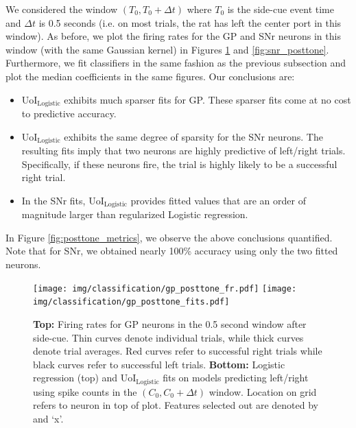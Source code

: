 \documentclass[11pt]{article}
\begin{document}
We considered the window $(T_0, T_0 + \Delta t)$ where $T_0$ is the side-cue event time and $\Delta t$ is 0.5 seconds (i.e. on most trials, the rat has left the center port in this window). As before, we plot the firing rates for the GP and SNr neurons in this window (with the same Gaussian kernel) in Figures \ref{fig:gp_posttone} and \ref{fig:snr_posttone}. Furthermore, we fit classifiers in the same fashion as the previous subsection and plot the median coefficients in the same figures. Our conclusions are:
\begin{itemize}
	\item  UoI$_{\text{Logistic}}$ exhibits much sparser fits for GP. These sparser fits come at no cost to predictive accuracy.
	\item UoI$_{\text{Logistic}}$ exhibits the same degree of sparsity for the SNr neurons. The resulting fits imply that two neurons are highly predictive of left/right trials. Specifically, if these neurons fire, the trial is highly likely to be a successful right trial. 
	\item In the SNr fits, UoI$_{\text{Logistic}}$ provides fitted values that are an order of magnitude larger than regularized Logistic regression.
\end{itemize}
In Figure \ref{fig:posttone_metrics}, we observe the above conclusions quantified. Note that for SNr, we obtained nearly 100\% accuracy using only the two fitted neurons.
\begin{figure}[H]
	\centering
	\texttt{[image: img/classification/gp\_posttone\_fr.pdf]}
	\texttt{[image: img/classification/gp\_posttone\_fits.pdf]}
	\caption{\textbf{Top:} Firing rates for GP neurons in the 0.5 second window after side-cue. Thin curves denote individual trials, while thick curves denote trial averages. Red curves refer to successful right trials while black curves refer to successful left trials. \textbf{Bottom:} Logistic regression (top) and UoI$_{\text{Logistic}}$ fits on models predicting left/right using spike counts in the $(C_0, C_0+\Delta t)$ window. Location on grid refers to neuron in top of plot. Features selected out are denoted by and `x'.}
	\label{fig:gp_posttone}
\end{figure}
\end{document}
